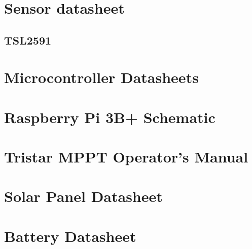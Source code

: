 
\section{Sensor datasheet}
\subsection{TSL2591}

\section{Microcontroller Datasheets}

\section{Raspberry Pi 3B+ Schematic}


\section{Tristar MPPT Operator's Manual}


\section{Solar Panel Datasheet}


\section{Battery Datasheet}
